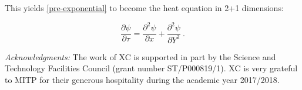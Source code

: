 \documentclass[english,12pt]{article}
\begin{document}
This yields \ref{pre-exponential} to become the heat equation in 2+1 dimensions:


\begin{equation}
\frac{\partial \psi}{\partial \tau} = \frac{\partial^2 \psi}{\partial x} + \frac{\partial^2 \psi}{\partial Y^2}~.
\end{equation}

















{\it Acknowledgments:}
The work of XC is supported in part  by the Science and Technology Facilities Council (grant number  ST/P000819/1). XC is very grateful to MITP for their generous hospitality during the academic year 2017/2018. 



\bigskip{}


\baselineskip=1.6pt 

\begin{thebibliography}{10}

   
\end{thebibliography}
\end{document}
